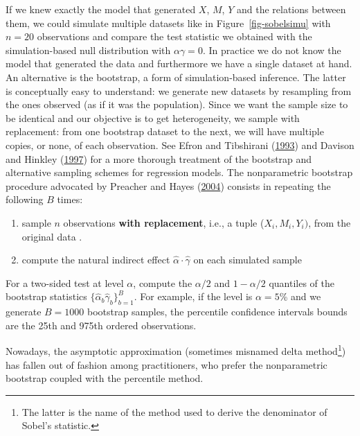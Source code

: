 \documentclass[
  11pt,
  letterpaper,
]{scrbook}
\providecommand{\tightlist}{%
  \setlength{\itemsep}{0pt}\setlength{\parskip}{0pt}}\usepackage{longtable,booktabs,array}
\theoremstyle{definition}
\theoremstyle{remark}
\begin{document}
If we knew exactly the model that generated \(X\), \(M\), \(Y\) and the
relations between them, we could simulate multiple datasets like in
Figure~\ref{fig-sobelsimu} with \(n=20\) observations and compare the
test statistic we obtained with the simulation-based null distribution
with \(\alpha\gamma=0\). In practice we do not know the model that
generated the data and furthermore we have a single dataset at hand. An
alternative is the bootstrap, a form of simulation-based inference. The
latter is conceptually easy to understand: we generate new datasets by
resampling from the ones observed (as if it was the population). Since
we want the sample size to be identical and our objective is to get
heterogeneity, we sample with replacement: from one bootstrap dataset to
the next, we will have multiple copies, or none, of each observation.
See Efron and Tibshirani
(\protect\hyperlink{ref-Efron.Tibshirani:1993}{1993}) and Davison and
Hinkley (\protect\hyperlink{ref-Davison.Hinkley:1997}{1997}) for a more
thorough treatment of the bootstrap and alternative sampling schemes for
regression models. The nonparametric bootstrap procedure advocated by
Preacher and Hayes (\protect\hyperlink{ref-Preacher.Hayes:2004}{2004})
consists in repeating the following \(B\) times:

\begin{enumerate}
\def\labelenumi{\arabic{enumi})}
\tightlist
\item
  sample \(n\) observations \textbf{with replacement}, i.e., a tuple
  (\(X_i, M_i, Y_i)\), from the original data .
\item
  compute the natural indirect effect
  \(\widehat{\alpha}\cdot\widehat{\gamma}\) on each simulated sample
\end{enumerate}

For a two-sided test at level \(\alpha\), compute the \(\alpha/2\) and
\(1-\alpha/2\) quantiles of the bootstrap statistics
\(\{\widehat{\alpha}_b\widehat{\gamma}_b\}_{b=1}^B\). For example, if
the level is \(\alpha=5\)\% and we generate \(B=1000\) bootstrap
samples, the percentile confidence intervals bounds are the 25th and
975th ordered observations.

Nowadays, the asymptotic approximation (sometimes misnamed delta
method\footnote{The latter is the name of the method used to derive the
  denominator of Sobel's statistic.}) has fallen out of fashion among
practitioners, who prefer the nonparametric bootstrap coupled with the
percentile method.
\end{document}
